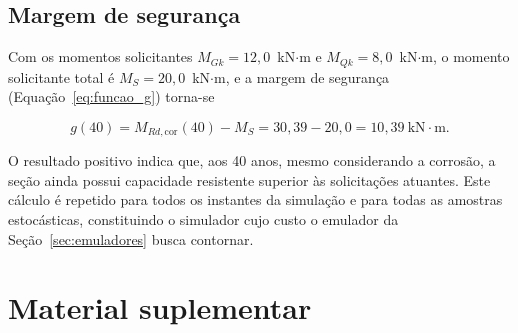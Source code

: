 \begin{appendices}
\subsection{Margem de seguran\c{c}a}

Com os momentos solicitantes $M_{Gk} = 12{,}0$~kN$\cdot$m e $M_{Qk} = 8{,}0$~kN$\cdot$m, o momento solicitante total é $M_S = 20{,}0$~kN$\cdot$m, e a margem de segurança (Equação~\ref{eq:funcao_g}) torna-se

\begin{equation}
g(40) = M_{Rd,\mathrm{cor}}(40) - M_S = 30{,}39 - 20{,}0 = 10{,}39~\text{kN}\cdot\text{m}.
\end{equation}

O resultado positivo indica que, aos 40 anos, mesmo considerando a corrosão, a seção ainda possui capacidade resistente superior às solicitações atuantes. Este cálculo é repetido para todos os instantes da simulação e para todas as amostras estocásticas, constituindo o simulador cujo custo o emulador da Seção~\ref{sec:emuladores} busca contornar.

\section{Material suplementar}
\label{app:suplementar}


\end{appendices}
